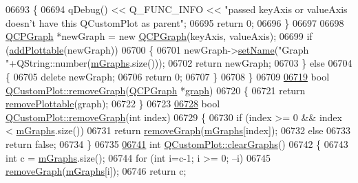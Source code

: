 \begin{DoxyCode}
06693   \{
06694     qDebug() << Q\_FUNC\_INFO << \textcolor{stringliteral}{"passed keyAxis or valueAxis doesn't have this QCustomPlot as parent"};
06695     \textcolor{keywordflow}{return} 0;
06696   \}
06697   
06698   \hyperlink{a00031}{QCPGraph} *newGraph = \textcolor{keyword}{new} \hyperlink{a00031}{QCPGraph}(keyAxis, valueAxis);
06699   \textcolor{keywordflow}{if} (\hyperlink{a00116_ab7ad9174f701f9c6f64e378df77927a6}{addPlottable}(newGraph))
06700   \{
06701     newGraph->\hyperlink{a00024_ab79c7ba76bc7fa89a4b3580e12149f1f}{setName}(\textcolor{stringliteral}{"Graph "}+QString::number(\hyperlink{a00116_a54ed2081d9366a6c2137bf9d9f7b8371}{mGraphs}.size()));
06702     \textcolor{keywordflow}{return} newGraph;
06703   \} \textcolor{keywordflow}{else}
06704   \{
06705     \textcolor{keyword}{delete} newGraph;
06706     \textcolor{keywordflow}{return} 0;
06707   \}
06708 \}
06709 
\hypertarget{a00115_source_l06719}{}\hyperlink{a00116_a903561be895fb6528a770d66ac5e6713}{06719} \textcolor{keywordtype}{bool} \hyperlink{a00116_a903561be895fb6528a770d66ac5e6713}{QCustomPlot::removeGraph}(\hyperlink{a00031}{QCPGraph} *\hyperlink{a00116_ac6b19830ab0f0073ff3089cf7c9b3c2e}{graph})
06720 \{
06721   \textcolor{keywordflow}{return} \hyperlink{a00116_af3dafd56884208474f311d6226513ab2}{removePlottable}(graph);
06722 \}
06723 
\hypertarget{a00115_source_l06728}{}\hyperlink{a00116_a9554b3d2d5b10c0f884bd4010b6c192c}{06728} \textcolor{keywordtype}{bool} \hyperlink{a00116_a903561be895fb6528a770d66ac5e6713}{QCustomPlot::removeGraph}(\textcolor{keywordtype}{int} index)
06729 \{
06730   \textcolor{keywordflow}{if} (index >= 0 && index < \hyperlink{a00116_a54ed2081d9366a6c2137bf9d9f7b8371}{mGraphs}.size())
06731     \textcolor{keywordflow}{return} \hyperlink{a00116_a903561be895fb6528a770d66ac5e6713}{removeGraph}(\hyperlink{a00116_a54ed2081d9366a6c2137bf9d9f7b8371}{mGraphs}[index]);
06732   \textcolor{keywordflow}{else}
06733     \textcolor{keywordflow}{return} \textcolor{keyword}{false};
06734 \}
06735 
\hypertarget{a00115_source_l06741}{}\hyperlink{a00116_ab0f3abff2d2f7df3668b5836f39207fa}{06741} \textcolor{keywordtype}{int} \hyperlink{a00116_ab0f3abff2d2f7df3668b5836f39207fa}{QCustomPlot::clearGraphs}()
06742 \{
06743   \textcolor{keywordtype}{int} c = \hyperlink{a00116_a54ed2081d9366a6c2137bf9d9f7b8371}{mGraphs}.size();
06744   \textcolor{keywordflow}{for} (\textcolor{keywordtype}{int} i=c-1; i >= 0; --i)
06745     \hyperlink{a00116_a903561be895fb6528a770d66ac5e6713}{removeGraph}(\hyperlink{a00116_a54ed2081d9366a6c2137bf9d9f7b8371}{mGraphs}[i]);
06746   \textcolor{keywordflow}{return} c;

\end{DoxyCode}
